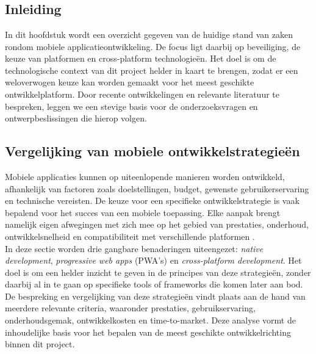 \chapter{}
\label{ch:stand-van-zaken}

\section{Inleiding}
In dit hoofdstuk wordt een overzicht gegeven van de huidige stand van zaken rondom mobiele applicatieontwikkeling. De focus ligt daarbij op beveiliging, de keuze van platformen en cross-platform technologieën. Het doel is om de technologische context van dit project helder in kaart te brengen, zodat er een weloverwogen keuze kan worden gemaakt voor het meest geschikte ontwikkelplatform. Door recente ontwikkelingen en relevante literatuur te bespreken, leggen we een stevige basis voor de onderzoeksvragen en ontwerpbeslissingen die hierop volgen.

\section{Vergelijking van mobiele ontwikkelstrategieën}

Mobiele applicaties kunnen op uiteenlopende manieren worden ontwikkeld, afhankelijk van factoren zoals doelstellingen, budget, gewenste gebruikerservaring en technische vereisten. De keuze voor een specifieke ontwikkelstrategie is vaak bepalend voor het succes van een mobiele toepassing. Elke aanpak brengt namelijk eigen afwegingen met zich mee op het gebied van prestaties, onderhoud, ontwikkelsnelheid en compatibiliteit met verschillende platformen \autocite{Masi2012}.\\

In deze sectie worden drie gangbare benaderingen uiteengezet: \textit{native development}, \textit{progressive web apps} (PWA’s) en \textit{cross-platform development}. Het doel is om een helder inzicht te geven in de principes van deze strategieën, zonder daarbij al in te gaan op specifieke tools of frameworks die komen later aan bod.\\

De bespreking en vergelijking van deze strategieën vindt plaats aan de hand van meerdere relevante criteria, waaronder prestaties, gebruikservaring, onderhoudsgemak, ontwikkelkosten en time-to-market. Deze analyse vormt de inhoudelijke basis voor het bepalen van de meest geschikte ontwikkelrichting binnen dit project.



